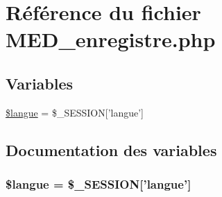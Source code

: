 \hypertarget{MED__enregistre_8php}{
\section{R\'{e}f\'{e}rence du fichier MED\_\-enregistre.php}
\label{MED__enregistre_8php}
}
\subsection*{Variables}
\begin{CompactItemize}
\item 
\hyperlink{MED__enregistre_8php_a0}{\$langue} = \$\_\-SESSION\mbox{[}'langue'\mbox{]}
\end{CompactItemize}


\subsection{Documentation des variables}
\hypertarget{MED__enregistre_8php_a0}{
\subsubsection[\$langue]{\setlength{\rightskip}{0pt plus 5cm}\$langue = \$\_\-SESSION\mbox{[}'langue'\mbox{]}}}
\label{MED__enregistre_8php_a0}


